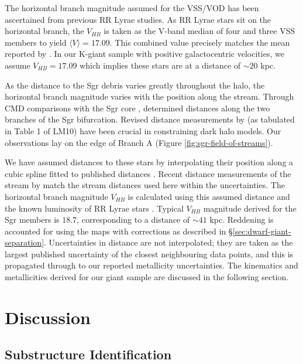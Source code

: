 \documentclass[preprint2]{aastex}
\begin{document}
The horizontal branch magnitude assumed for the VSS/VOD has been ascertained from previous RR Lyrae studies. As RR Lyrae stars sit on the horizontal branch, the $V_{HB}$ is taken as the V-band median of four \citet{Prior;et-al_2009a} and three  \citet{Duffau;et-al_2006} VSS members to yield $\langle{}V\rangle{} = 17.09$. This combined value precisely matches the mean reported by \citet{Duffau;et-al_2006}. In our K-giant sample with positive galactocentric velocities, we assume $V_{HB} = 17.09$ which implies these stars are at a distance of $\sim20$ kpc.

As the distance to the Sgr debris varies greatly throughout the halo, the horizontal branch magnitude varies with the position along the stream. 
Through CMD comparisons with the Sgr core \citep{Bellazzini;et-al_2006}, \citet{Belokurov;et-al_2006} determined distances along the two branches of the Sgr bifurcation.  Revised distance measurements by \citet{Siegel;et-al_2007} (as tabulated in Table 1 of LM10) have been crucial in constraining dark halo models. Our observations lay on the edge of Branch A (Figure \ref{fig:sgr-field-of-streams}).

We have assumed distances to these stars by interpolating their position along a cubic spline fitted to published distances \citep{Siegel;et-al_2007}. Recent distance measurements of the stream by \citet{Ruhland;et-al_2011} match the stream distances used here within the uncertainties. The horizontal branch magnitude $V_{HB}$ is calculated using this assumed distance and the known luminosity of RR Lyrae stars \citep[$M_V = +0.69;$][]{Tsujimoto;et-al_1998}. Typical $V_{HB}$ magnitude derived for the Sgr members is $18.7$, corresponding to a distance of $\sim{}41$ kpc. Reddening is accounted for using the \citet{Schlegel;Finkbeiner;Davis_1998} maps with \citet{Schlafly;Finkbeiner_2011} corrections as described in \S\ref{sec:dwarf-giant-separation}. Uncertainties in distance are not interpolated; they are taken as the largest published uncertainty of the closest neighbouring data points, and this is propagated through to our reported metallicity uncertainties. The kinematics and metallicities derived for our giant sample are discussed in the following section.

\section{Discussion}
\label{sec:discussion}
		
	\subsection{Substructure Identification}
	\label{sec:substructure-identification}
		
\end{document}
